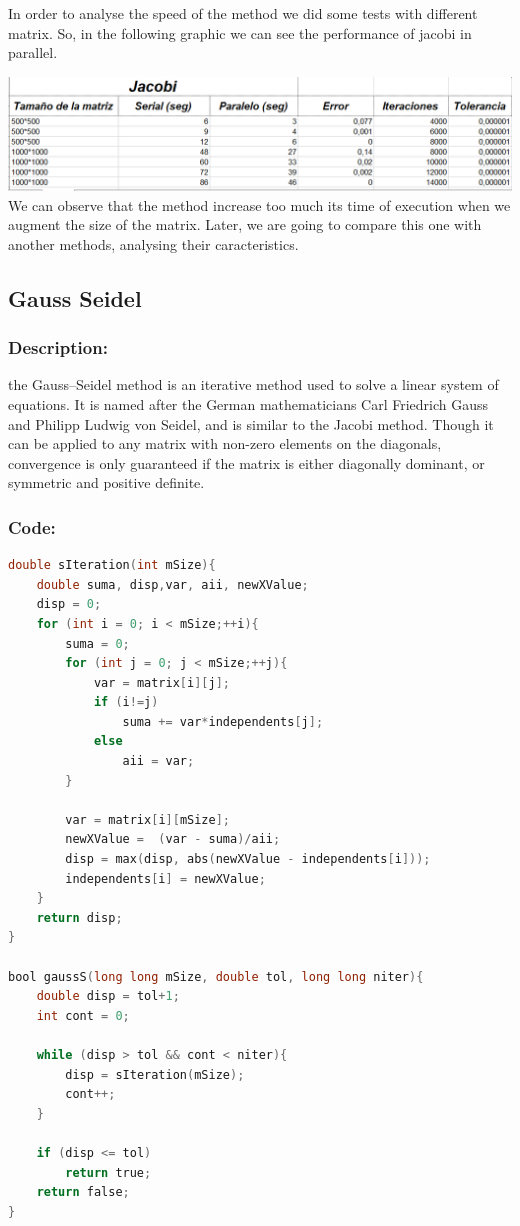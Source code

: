 \documentclass{article}
\begin{document}
In order to analyse the speed of the method we did some tests with different matrix. So, in the following graphic we can see the performance of jacobi in parallel.

\includegraphics[width=\linewidth]{./images/jacobi.PNG}\\

We can observe that the method increase too much its time of execution when we augment the size of the matrix. Later, we are going to compare this one with another methods, analysing their caracteristics.


\subsection{Gauss Seidel}

\subsubsection{Description:}
 the Gauss–Seidel method is an iterative method used to solve a linear system of equations. It is named after the German mathematicians Carl Friedrich Gauss and Philipp Ludwig von Seidel, and is similar to the Jacobi method. Though it can be applied to any matrix with non-zero elements on the diagonals, convergence is only guaranteed if the matrix is either diagonally dominant, or symmetric and positive definite.

\subsubsection{Code:}

\begin{lstlisting}[language=C]
  double sIteration(int mSize){
    double suma, disp,var, aii, newXValue;
    disp = 0;
    for (int i = 0; i < mSize;++i){
        suma = 0;
        for (int j = 0; j < mSize;++j){
            var = matrix[i][j];
            if (i!=j)
                suma += var*independents[j];
            else
                aii = var;
        }

        var = matrix[i][mSize];
        newXValue =  (var - suma)/aii;
        disp = max(disp, abs(newXValue - independents[i]));
        independents[i] = newXValue;
    }
    return disp;
}

bool gaussS(long long mSize, double tol, long long niter){
    double disp = tol+1;
    int cont = 0;

    while (disp > tol && cont < niter){
        disp = sIteration(mSize);
        cont++;
    }

    if (disp <= tol)
        return true;
    return false;
}

\end{lstlisting}
\end{document}
